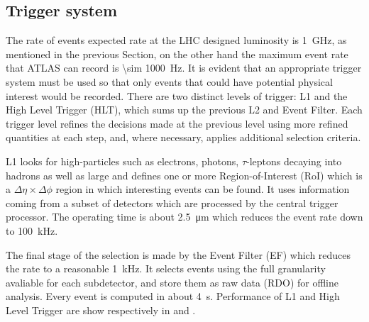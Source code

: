\subsection{Trigger system}
The rate of events expected rate at the LHC designed luminosity is \SI{1}{\GHz}, as mentioned in the previous Section, on the other hand the maximum event rate that ATLAS can record is \SI{\sim 1000}{\Hz}. It is evident that an appropriate trigger system must be used so that only events that could have potential physical interest would be recorded. There are two distinct levels of trigger: L1 and the High Level Trigger (HLT), which sums up the previous L2 and Event Filter. Each trigger level refines the decisions made at the previous level using more refined quantities at each step, and, where necessary, applies additional selection criteria.

L1 looks for high-\pt particles such as electrons, photons, $\tau$-leptons decaying into hadrons as well as large \met and defines one or more Region-of-Interest (RoI) which is a $\Delta \eta \times \Delta \phi$ region in which interesting events can be found. It uses information coming from a subset of detectors which are processed by the central trigger processor. The operating time is about \SI{2.5}{\um} which reduces the event rate down to \SI{100}{\kHz}.

The final stage of the selection is made by the Event Filter (EF) which reduces the rate to a reasonable \SI{1}{\kHz}. It selects events using the full granularity avaliable for each subdetector, and store them as raw data (RDO) for offline analysis. Every event is computed in about \SI{4}{\s}. Performance of L1 and High Level Trigger are show respectively in \Fig{\ref{fig:L1}} and \Fig{\ref{fig:HLT}}.

